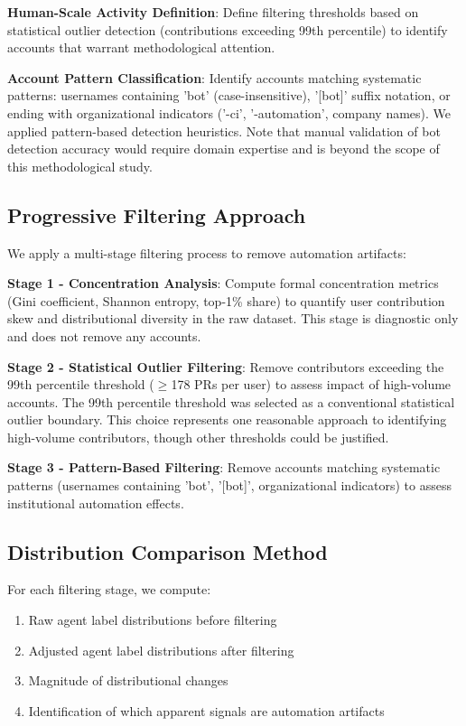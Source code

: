\documentclass[conference]{IEEEtran}
\begin{document}
\textbf{Human-Scale Activity Definition}: Define filtering thresholds based on statistical outlier detection (contributions exceeding 99th percentile) to identify accounts that warrant methodological attention.

\textbf{Account Pattern Classification}: Identify accounts matching systematic patterns: usernames containing 'bot' (case-insensitive), '[bot]' suffix notation, or ending with organizational indicators ('-ci', '-automation', company names). We applied pattern-based detection heuristics. Note that manual validation of bot detection accuracy would require domain expertise and is beyond the scope of this methodological study.

\subsection{Progressive Filtering Approach}

We apply a multi-stage filtering process to remove automation artifacts:

\textbf{Stage 1 - Concentration Analysis}: Compute formal concentration metrics (Gini coefficient, Shannon entropy, top-1\% share) to quantify user contribution skew and distributional diversity in the raw dataset. This stage is diagnostic only and does not remove any accounts.

\textbf{Stage 2 - Statistical Outlier Filtering}: Remove contributors exceeding the 99th percentile threshold ($\geq$178 PRs per user) to assess impact of high-volume accounts. The 99th percentile threshold was selected as a conventional statistical outlier boundary. This choice represents one reasonable approach to identifying high-volume contributors, though other thresholds could be justified.

\textbf{Stage 3 - Pattern-Based Filtering}: Remove accounts matching systematic patterns (usernames containing 'bot', '[bot]', organizational indicators) to assess institutional automation effects.

\subsection{Distribution Comparison Method}

For each filtering stage, we compute:

\begin{enumerate}
    \item Raw agent label distributions before filtering
    \item Adjusted agent label distributions after filtering  
    \item Magnitude of distributional changes
    \item Identification of which apparent signals are automation artifacts
\end{enumerate}
\end{document}
